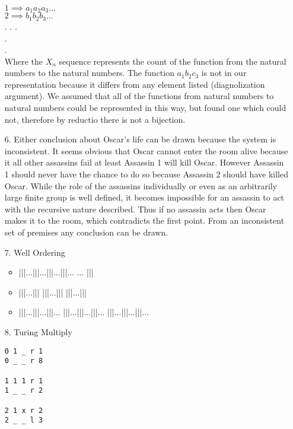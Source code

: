 \documentclass{article}
\begin{document}
\begin{enumerate}
$1 \implies a_{1}a_{2}a_{3}...$\\
$2 \implies b_{1}b_{2}b_{3}...$\\
. . .\\
.\\
.\\

Where the $X_n$ sequence represents the count of the function from the natural numbers to the natural numbers. The function $a_{1}b_{2}c_{3}$ is not in our representation because it differs from any element listed (diagnolization argument). We assumed that all of the functions from natural numbers to natural numbers could be represented in this way, but found one which could not, therefore by reductio there is not a bijection.

\newpage

\item[6.]
	Either conclusion about Oscar's life can be drawn because the system is inconsistent. It seems obvious that Oscar cannot enter the room alive because it all other assassins fail at least Assassin 1 will kill Oscar. However Assassin 1 should never have the chance to do so because Assassin 2 should have killed Oscar. While the role of the assassins individually or even as an arbitrarily large finite group is well defined, it becomes impossible for an assassin to act with the recursive nature described. Thus if no assassin acts then Oscar makes it to the room, which contradicts the first point. From an inconsistent set of premises any conclusion can be drawn. 

\newpage

\item[7.]
	Well Ordering\\

	\begin{itemize}
	\item |||...|||...|||...|||... ... |||
	\item |||...||| |||...||| |||...|||
	\item |||...|||...|||... |||...|||...|||... |||...|||...|||...
	\end{itemize}

\newpage 

\item[8.]
	Turing Multiply\\

\begin{verbatim}
0 1 _ r 1
0 _ _ r 8

1 1 1 r 1
1 _ _ r 2

2 1 x r 2
2 _ _ l 3


\end{verbatim}
\end{enumerate}
\end{document}
